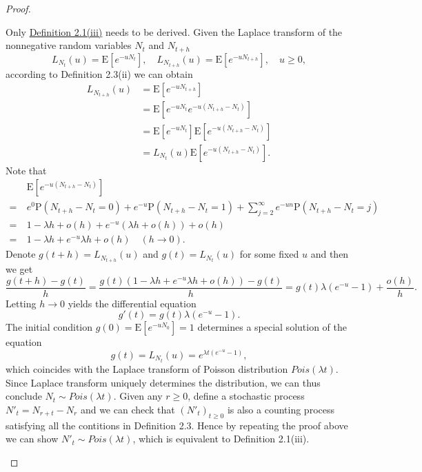 \documentclass{article}
\theoremstyle{nonumberplain}
\newtheorem{proof}{Proof.}
\begin{document}
\begin{proof}
\begin{itemize}
	Only \hyperlink{Definition 2.1(iii)}{Definition 2.1(iii)} needs to be derived. Given the Laplace transform of the nonnegative random variables $N_t$ and $N_{t+h}$
	\[
	L_{N_t}(u)=\mathrm{E}[e^{-uN_t}],\quad
	L_{N_{t+h}}(u)=\mathrm{E}[e^{-uN_{t+h}}],\quad u\ge0,
	\]
	according to Definition 2.3(ii) we can obtain
	\begin{align*}
	L_{N_{t+h}}(u)&=\mathrm{E}[e^{-uN_{t+h}}]\\
	&=\mathrm{E}[e^{-uN_{t}}e^{-u(N_{t+h}-N_t)}]\\
	&=\mathrm{E}[e^{-uN_{t}}]\mathrm{E}[e^{-u(N_{t+h}-N_t)}]\\
	&=L_{N_t}(u)\mathrm{E}[e^{-u(N_{t+h}-N_t)}].
	\end{align*}
	Note that 
	\begin{align*}
	&\mathrm{E}[e^{-u(N_{t+h}-N_t)}]\\
	=\ &e^{0}\mathrm{P}(N_{t+h}-N_t=0)+e^{-u}\mathrm{P}(N_{t+h}-N_t=1)+\sum_{j=2}^{\infty}e^{-un}\mathrm{P}(N_{t+h}-N_t=j)\\
	=\ &1-\lambda h+o(h)+e^{-u}(\lambda h+o(h))+o(h)\\
	=\ &1-\lambda h+e^{-u}\lambda h+o(h)\quad(h\to 0).
	\end{align*}
	Denote $g(t+h)=L_{N_{t+h}}(u)$ and $g(t)=L_{N_{t}}(u)$ for some fixed $u$ and then we get 
	\[
	\frac{g(t+h)-g(t)}{h}=\frac{g(t)(1-\lambda h+e^{-u}\lambda h+o(h))-g(t)}{h}=g(t)\lambda (e^{-u}-1)+\frac{o(h)}{h}.
	\]
	Letting $h\to 0$ yields the differential equation
	\[
	g'(t)=g(t)\lambda (e^{-u}-1).
	\]
	The initial condition $g(0)=\mathrm{E}[e^{-uN_{0}}]=1$ determines a special solution of the equation 
	$$g(t)=L_{N_{t}}(u)=e^{\lambda t (e^{-u}-1)},$$
	which coincides with the Laplace transform of Poisson distribution $Pois(\lambda t)$. Since Laplace transform uniquely determines the distribution, we can thus conclude $N_{t}\sim Pois(\lambda t)$. Given any $r\ge 0$, define a stochastic process $N'_t=N_{r+t}-N_r$ and we can check that $(N'_t)_{t\ge 0}$ is also a counting process satisfying all the contitions in Definition 2.3. Hence by repeating the proof above we can show $N'_{t}\sim Pois(\lambda t)$, which is equivalent to Definition 2.1(iii).


\end{itemize}
\end{proof}
\end{document}
